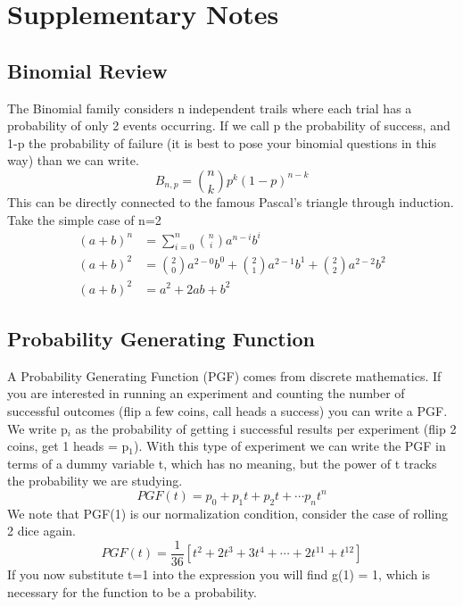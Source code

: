 \documentclass{article}
\begin{document}
\section{Supplementary Notes}
\subsection{Binomial Review} 
The Binomial family considers n independent trails where each trial has a probability of only 2 events occurring. 
If we call p the probability of success, and 1-p the probability of failure (it is best to pose your binomial questions in this way) than we can write. 
\begin{equation}
    B_{n,p} = \binom{n}{k}p^k(1-p)^{n-k}
\end{equation}
This can be directly connected to the famous Pascal's triangle through induction. 
Take the simple case of n=2
\begin{equation}
\begin{split}
    (a+b)^n &= \sum_{i=0}^n \binom{n}{i}a^{n-i}b^i\\
    (a+b)^2 &= \binom{2}{0}a^{2-0}b^0 + \binom{2}{1}a^{2-1}b^1 + \binom{2}{2}a^{2-2}b^2\\
    (a+b)^2 &= a^2+2ab+b^2
    \end{split}
\end{equation}

\subsection{Probability Generating Function}
A Probability Generating Function (PGF) comes from discrete mathematics. 
If you are interested in running an experiment and counting the number of successful outcomes (flip a few coins, call heads a success) you can write a PGF. 
We write p$_i$ as the probability of getting i successful results per experiment (flip 2 coins, get 1 heads = p$_1$). 
With this type of experiment we can write the PGF in terms of a dummy variable t, which has no meaning, but the power of t tracks the probability we are studying. 
\begin{equation}
    PGF(t) = p_0 + p_1t + p_2t + \cdots p_nt^n
\end{equation}
We note that PGF(1) is our normalization condition, consider the case of rolling 2 dice again. 
\begin{equation}
    PGF(t) = \frac{1}{36}[ t^2 + 2t^3 + 3t^4 + \cdots + 2t^{11} + t^{12}]
\end{equation}
If you now substitute t=1 into the expression you will find g(1) = 1, which is necessary for the function to be a probability. 
\end{document}
